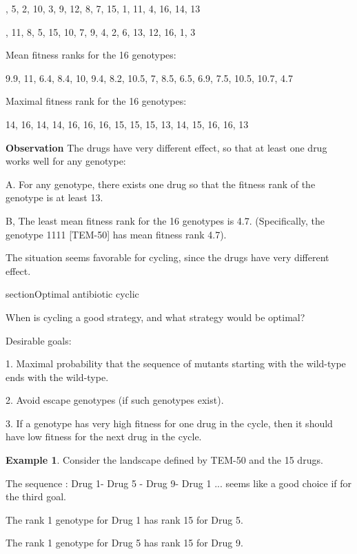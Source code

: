 \documentclass[12pt]{amsart}
\theoremstyle{plain}
\theoremstyle{definition}
\newtheorem{example}[theorem]{Example}
\begin{document}
{, 5, 2, 10, 3, 9, 12, 8, 7, 15, 1, 11, 4, 16, 14, 13


, 11, 8, 5, 15, 10, 7, 9, 4, 2, 6, 13, 12, 16, 1, 3



\bigskip
Mean fitness ranks for the 16 genotypes:

9.9, 11, 6.4, 8.4, 10, 9.4, 8.2, 10.5, 7, 8.5, 6.5, 6.9, 7.5, 10.5, 10.7, 4.7

\bigskip
Maximal fitness rank for the 16 genotypes:

14, 16, 14, 14, 16, 16, 16, 15, 15, 15, 13, 14, 15, 16, 16, 13


\bigskip
\noindent
{\bf{Observation}}
The drugs have very different effect, so that at least one
drug works well for any genotype:

A. For any genotype, there exists one drug
so that the fitness rank of the genotype is at least 13.

B, The least mean fitness rank for the 16 genotypes
is 4.7. (Specifically, the genotype 1111 [TEM-50]
has mean fitness rank 4.7).

The situation seems favorable 
for cycling, since the drugs have very different effect.





section{Optimal antibiotic cyclic}


When is cycling a good strategy, and what
strategy would be optimal?



\bigskip



Desirable goals: 

1. Maximal probability
that the sequence of mutants starting with the wild-type
 ends with the wild-type.


2. Avoid escape genotypes (if such genotypes exist).

3. If a genotype has very high fitness for one drug
in the cycle, then it should have low fitness for the next 
drug in the cycle.


\begin{example}
Consider the landscape defined by TEM-50 and the 15 drugs.


The sequence : Drug 1- Drug 5 - Drug 9- Drug 1 ...
seems like a good choice if for the third goal.

The rank 1 genotype for Drug 1 has rank 15 for Drug 5.

The rank 1 genotype for Drug 5 has rank 15 for Drug 9. 


\end{example}}
\end{document}
